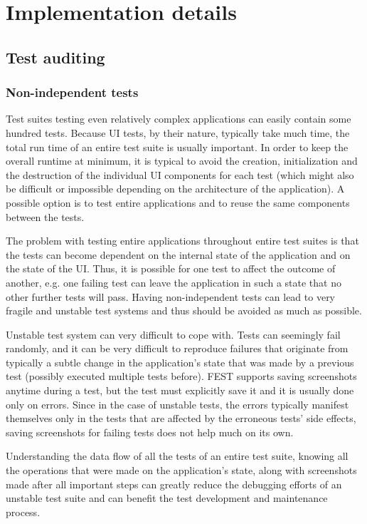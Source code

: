 
\chapter{Implementation details}\label{chap:implementation-details}

\section{Test auditing}\label{sec:test-auditing}

\subsection {Non-independent tests}

Test suites testing even relatively complex applications can easily contain some hundred tests. Because UI tests, by their nature, typically take much time, the total run time of an entire test suite is usually important. In order to keep the overall runtime at minimum, it is typical to avoid the creation, initialization and the destruction of the individual UI components for each test (which might also be difficult or impossible depending on the architecture of the application). A possible option is to test entire applications and to reuse the same components between the tests.

The problem with testing entire applications throughout entire test suites is that the tests can become dependent on the internal state of the application and on the state of the UI. Thus, it is possible for one test to affect the outcome of another, e.g. one failing test can leave the application in such a state that no other further tests will pass. Having non-independent tests can lead to very fragile and unstable test systems and thus should be avoided as much as possible.

Unstable test system can very difficult to cope with. Tests can seemingly fail randomly, and it can be very difficult to reproduce failures that originate from typically a subtle change in the application's state that was made by a previous test (possibly executed multiple tests before). FEST supports saving screenshots anytime during a test, but the test must explicitly save it and it is usually done only on errors. Since in the case of unstable tests, the errors typically manifest themselves only in the tests that are affected by the erroneous tests' side effects, saving screenshots for failing tests does not help much on its own.

Understanding the data flow of all the tests of an entire test suite, knowing all the operations that were made on the application's state, along with screenshots made after all important steps can greatly reduce the debugging efforts of an unstable test suite and can benefit the test development and maintenance process.

